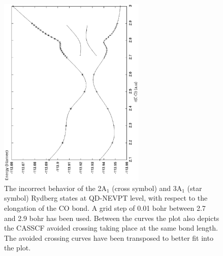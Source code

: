 \begin{center}
\begin{figure}[ht]
\begin{center}
\includegraphics[width=7cm,keepaspectratio,angle=270]{03_nevpt/images/qdpt_error.eps}
\end{center}
\caption{\footnotesize The incorrect behavior of the 2A$_1$ (cross symbol)
and 3A$_1$ (star symbol) Rydberg states at QD-NEVPT level, with respect to
the elongation of the CO bond. A grid step of 0.01 bohr between 2.7 and 2.9
bohr has been used.
Between the curves the plot also depicts the CASSCF avoided crossing taking
place at the same bond length. The avoided crossing curves have been
transposed to better fit into the plot. } \label{fig:qdpt_error}
\end{figure}
\end{center}
